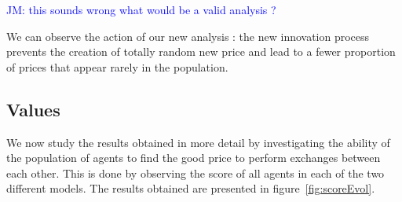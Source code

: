\documentclass{wscpaperproc}
\newcommand{\memo}[2]{\textcolor{#1}{#2}}
\newcommand{\jm}[1]{\memo{blue}{JM: #1\\}}
\begin{document}


\jm{this sounds wrong what would be a valid analysis ?}

We can observe the action of our new analysis : the new innovation process prevents the creation of totally random new price and lead to a fewer proportion of prices that appear rarely in the population.


\subsection{Values}

We now study the results obtained in more detail by investigating the ability of the population of agents to find the good price to perform exchanges between each other. This is done by observing the score of all agents in each of the two different models. The results obtained are presented in figure~\ref{fig:scoreEvol}.
\end{document}
